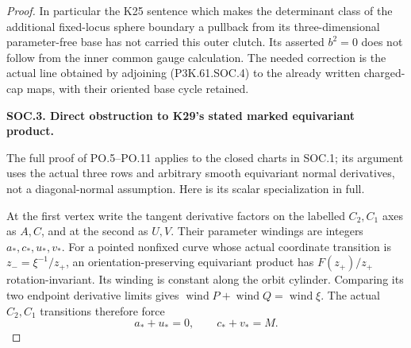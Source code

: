 \begin{proof}
In particular the K25 sentence which makes the determinant class of
the additional fixed-locus sphere boundary a pullback from its
three-dimensional parameter-free base has not carried this outer
clutch. Its asserted \(b^2=0\) does not follow from the inner common
gauge calculation. The needed correction is the actual line obtained
by adjoining (P3K.61.SOC.4) to the already written charged-cap maps, with
their oriented base cycle retained.

\par\medskip\noindent\textbf{SOC.3. Direct obstruction to K29's stated marked equivariant product.}\par\nopagebreak[4]

The full proof of PO.5--PO.11 applies to the closed charts in SOC.1;
its argument uses the actual three rows and arbitrary smooth
equivariant normal derivatives, not a diagonal-normal assumption.
Here is its scalar specialization in full.

At the first vertex write the tangent derivative factors on the
labelled \(C_2,C_1\) axes as \(A,C\), and at the second as \(U,V\).
Their parameter windings are integers \(a_*,c_*,u_*,v_*\).
For a pointed nonfixed curve whose actual coordinate transition is
\(z_-=\xi^{-1}/z_+\), an orientation-preserving equivariant product
has \(F(z_+)/z_+\) rotation-invariant. Its winding is constant along
the orbit cylinder. Comparing its two endpoint derivative limits
gives \(\operatorname{wind}P+\operatorname{wind}Q
=\operatorname{wind}\xi\). The actual \(C_2,C_1\) transitions
therefore force
\[
 a_*+u_*=0,\qquad c_*+v_*=M.
 \tag{P3K.61.SOC.6}
\]


\end{proof}
